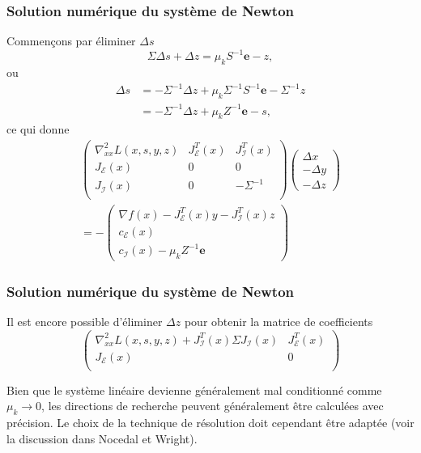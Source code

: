 \documentclass[usepdftitle=false,aspectratio=169]{beamer}
\def\cE{\mathcal{E}}
\def\cI{\mathcal{I}}
\def\be{\boldsymbol{e}}
\begin{document}
\begin{frame}
\frametitle{Solution numérique du système de Newton}

Commençons par éliminer $\Delta s$
$$
\Sigma \Delta s + \Delta z = \mu_k S^{-1} \be - z,
$$
ou
\begin{align*}
\Delta s &= - \Sigma^{-1} \Delta z + \mu_k \Sigma^{-1}S^{-1} \be - \Sigma^{-1}z \\
         &= - \Sigma^{-1} \Delta z + \mu_k Z^{-1} \be - s,
\end{align*}
ce qui donne
\begin{multline*}
	\begin{pmatrix}
		\nabla^2_{xx} L(x,s,y,z) &  J^T_{\cE}(x) &  J^T_{\cI}(x) \\
		J_{\cE}(x) & 0 & 0 \\
		J_{\cI}(x) & 0 & -\Sigma^{-1} \\
	\end{pmatrix}
	\begin{pmatrix}
		\Delta x \\
		-\Delta y \\
		-\Delta z	
	\end{pmatrix}
	\\
	= -\begin{pmatrix}
		\nabla f(x) - J^T_{\cE}(x) y - J^T_{\cI} (x) z \\
		c_{\cE}(x) \\
		c_{\cI}(x)- \mu_k Z^{-1} \be
	\end{pmatrix}
\end{multline*}

\end{frame}

\begin{frame}
\frametitle{Solution numérique du système de Newton}

Il est encore possible d'éliminer $\Delta z$ pour obtenir la matrice de coefficients
$$
	\begin{pmatrix}
\nabla^2_{xx} L(x,s,y,z) + J^T_{\cI}(x) \Sigma J_{\cI}(x)&  J^T_{\cE}(x) \\
J_{\cE}(x) & 0\\
\end{pmatrix}
$$

\mbox{}

Bien que le système linéaire devienne généralement mal conditionné comme $\mu_k \rightarrow 0$, les directions de recherche peuvent généralement être calculées avec précision. Le choix de la technique de résolution doit cependant être adaptée (voir la discussion dans Nocedal et Wright).

\end{frame}
\end{document}
